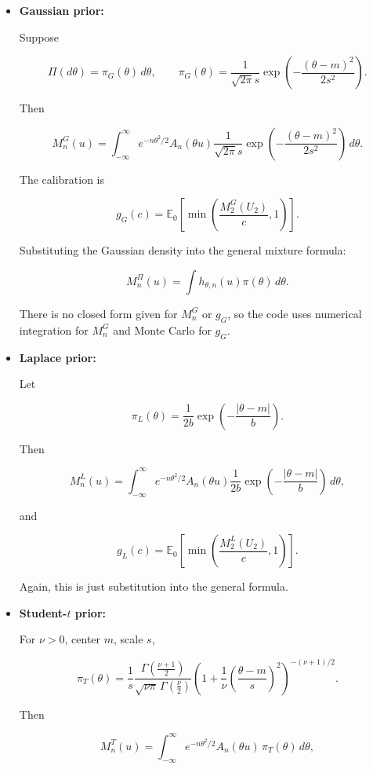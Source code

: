 \documentclass{article}%
\begin{document}
\begin{itemize}
    \item[A.] \textbf{Gaussian prior:}
    
    Suppose

\[
\Pi(d\theta)=\pi_G(\theta)\,d\theta,
\qquad
\pi_G(\theta)
=
\frac{1}{\sqrt{2\pi}s}
\exp\!\left(-\frac{(\theta-m)^2}{2s^2}\right).
\]

Then

\[
M_n^{G}(u)
=
\int_{-\infty}^\infty
e^{-n\theta^2/2}A_n(\theta u)
\frac{1}{\sqrt{2\pi}s}
\exp\!\left(-\frac{(\theta-m)^2}{2s^2}\right)
\,d\theta.
\]

The calibration is

\[
g_G(c)
=
\mathbb E_0\!\left[
\min\!\left(\frac{M_2^G(U_2)}{c},1\right)
\right].
\]

Substituting the Gaussian density into the general mixture formula:

\[
M_n^\Pi(u)=\int h_{\theta,n}(u)\pi(\theta)\,d\theta.
\]

There is no closed form given for \(M_n^G\) or \(g_G\), so the code uses numerical integration for \(M_n^G\) and Monte Carlo for \(g_G\).



\item[B.] \textbf{Laplace prior:}

Let

\[
\pi_L(\theta)
=
\frac{1}{2b}\exp\!\left(-\frac{|\theta-m|}{b}\right).
\]

Then

\[
M_n^{L}(u)
=
\int_{-\infty}^\infty
e^{-n\theta^2/2}A_n(\theta u)
\frac{1}{2b}\exp\!\left(-\frac{|\theta-m|}{b}\right)\,d\theta,
\]

and

\[
g_L(c)
=
\mathbb E_0\!\left[
\min\!\left(\frac{M_2^L(U_2)}{c},1\right)
\right].
\]

Again, this is just substitution into the general formula.


\item[C.] \textbf{Student-\(t\) prior:}

For \(\nu>0\), center \(m\), scale \(s\),

\[
\pi_T(\theta)
=
\frac{1}{s}
\frac{\Gamma\!\left(\frac{\nu+1}{2}\right)}
{\sqrt{\nu\pi}\,\Gamma\!\left(\frac{\nu}{2}\right)}
\left(
1+\frac{1}{\nu}\left(\frac{\theta-m}{s}\right)^2
\right)^{-(\nu+1)/2}.
\]

Then

\[
M_n^T(u)
=
\int_{-\infty}^\infty
e^{-n\theta^2/2}A_n(\theta u)\,\pi_T(\theta)\,d\theta,
\]


\end{itemize}
\end{document}
